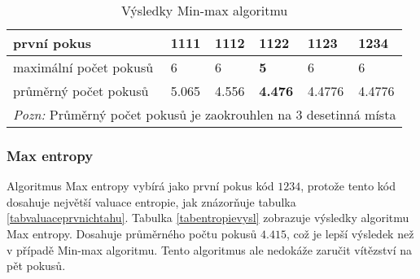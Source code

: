 
\begin{table}[h]
\centering
\begin{tabular}{l l l l l l}
\toprule
první pokus & 1111 & 1112 & \textbf{1122} & 1123 & 1234 \\
\midrule

maximální počet pokusů 
& 6 & 6 & \textbf{5} & 6 & 6 \\

průměrný počet pokusů 
& 5.065 & 4.556 & \textbf{4.476} & 4.4776 & 4.4776\\
\bottomrule
\multicolumn{6}{l}{\footnotesize \textit{Pozn:}
Průměrný počet pokusů je zaokrouhlen na $3$ desetinná místa}
\end{tabular}
\caption{Výsledky Min-max algoritmu}\label{tabminmaxvysl}
\end{table}

\subsubsection{Max entropy}

Algoritmus Max entropy vybírá jako první pokus kód $1234$, protože tento kód dosahuje největší valuace entropie, jak znázorňuje tabulka \ref{tabvaluaceprvnichtahu}. Tabulka \ref{tabentropievysl} zobrazuje výsledky algoritmu Max entropy. Dosahuje průměrného počtu pokusů $4.415$, což je lepší výsledek než v případě Min-max algoritmu. Tento algoritmus ale nedokáže zaručit vítězství na pět pokusů. 

